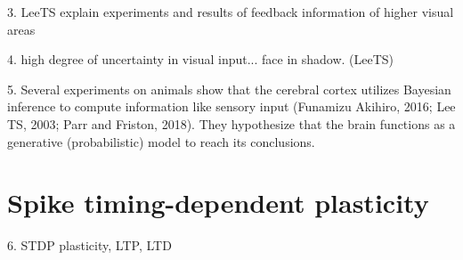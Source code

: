 3. LeeTS explain experiments and results of feedback information of higher visual areas

4. high degree of uncertainty in visual input... face in shadow. (LeeTS)

5. Several experiments on animals show that the cerebral
cortex utilizes Bayesian inference to compute information like sensory
input (Funamizu Akihiro, 2016; Lee TS, 2003; Parr and Friston, 2018). They
hypothesize that the brain functions as a generative (probabilistic) model
to reach its conclusions. 

\section{Spike timing-dependent plasticity}

6. STDP plasticity, LTP, LTD